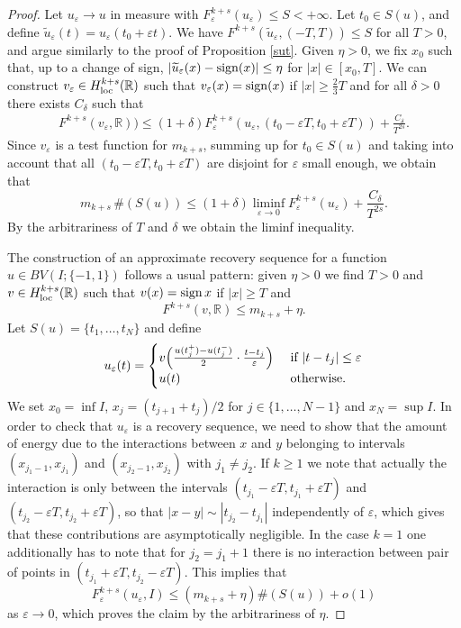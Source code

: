 \documentclass{article}
\newcommand{\e}{\varepsilon}
\begin{document}
\begin{proof} Let $u_\e\to u$ in measure with $F^{k+s}_\e(u_\e)\le S<+\infty$. Let $t_0\in S(u)$, and define 
$\widetilde u_\e(t) = u_\e(t_0+\e t)$. We have $F^{k+s}(\widetilde u_\e, (-T,T))\le S$ for all $T>0$, and argue similarly to the proof of  Proposition \rm\ref{sut}. Given $\eta>0$, we fix $x_0$ such that, up to a change of sign, $|\widetilde u_\e(x)-{\rm sign}(x)|\le \eta$ for $|x|\in[x_0, T]$. We can construct $v_\e\in H^{k+s}_{\rm loc}(\mathbb R)$ such that $v_\e(x)={\rm sign}(x)$ if $|x|\ge \frac23 T$ and for all $\delta>0$ there exists $C_\delta$ such that 
\begin{eqnarray*}\nonumber
F^{k+s}(v_\e,\mathbb R))\le (1+\delta) F^{k+s}_\e(u_\e,(t_0-\e T,t_0+\e T)) +\frac{C_\delta}{T^{2s}}.
\end{eqnarray*}
Since $v_\e$ is a test function for $m_{k+s}$, summing up for $t_0\in S(u)$ and taking into account that all $(t_0-\e T,t_0+\e T)$ are disjoint for $\e$ small enough, we obtain that
$$
m_{k+s}\,\#(S(u))\le  (1+\delta) \liminf_{\e\to 0} F^{k+s}_\e(u_\e) + \frac{C_\delta}{T^{2s}}.
$$
By the arbitrariness of $T$ and $\delta$ we obtain the liminf inequality. 

\smallskip
The construction of an approximate recovery sequence for a function $u\in BV(I;\{-1,1\})$ follows a usual pattern:
given $\eta>0$ we find $T>0$ and $v\in H^{k+s}_{\rm loc}(\mathbb R)$ such that $v(x)={\rm sign}\, x$ if $|x| \ge T$ and 
$$
F^{k+s}(v,\mathbb R)\le m_{k+s}+\eta.
$$
Let $S(u)=\{t_1,\ldots, t_N\}$ and define 
$$
u_\e(t)=\begin{cases}
v\Big(\frac{u(t_j^+)-u(t_j^-)}2\cdot\frac{t-t_j}\e\Big) & \hbox{ if } |t-t_j|\le \e\\
u(t) & \hbox{ otherwise.}
\end{cases}
$$
We set $x_0=\inf I$, $x_j=(t_{j+1}+t_j)/2$ for $j\in\{1,\ldots, N-1\}$ and $x_N=\sup I$.
In order to check that $u_\e$ is a recovery sequence, we need to show that the amount of energy due to
the interactions between $x$ and $y$ belonging to intervals $(x_{j_1-1}, x_{j_1})$ and $(x_{j_2-1}, x_{j_2})$ with $j_1\neq j_2$. If $k\ge 1$ we note that actually the interaction is only between the intervals $(t_{j_1}-\e T,t_{j_1}+\e T)$ and $(t_{j_2}-\e T,t_{j_2}+\e T)$, so that $|x-y| \sim |t_{j_2}-t_{j_1}|$ independently of $\e$, which gives that these contributions are asymptotically negligible. In the case $k=1$ one additionally has to note that for ${j_2}={j_1}+1$ there is no interaction between pair of points in $(t_{j_1}+\e T, t_{j_2}-\e T)$. This implies that
$$
F_\e^{k+s}(u_\e,I)\le (m_{k+s}+\eta)\#(S(u)) +o(1)
$$
as $\e\to 0$, which proves the claim by the arbitrariness of $\eta$.
\end{proof}
\end{document}
